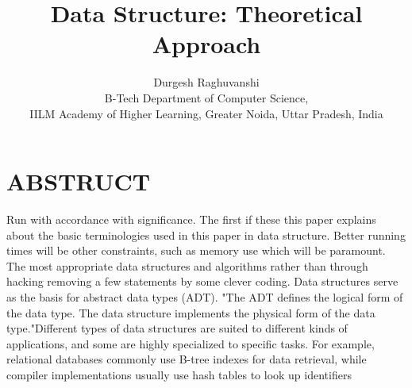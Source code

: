 \documentclass{article}
\title{Data Structure: Theoretical Approach}
\author{ Durgesh Raghuvanshi\\
         B-Tech Department of Computer Science,\\
IILM Academy of Higher Learning, Greater Noida, Uttar Pradesh, India}
\begin{document}
\section{ABSTRUCT}
Run with accordance with significance. The first if
these this paper explains about the basic terminologies
used in this paper in data structure. Better running
times will be other constraints, such as memory use
which will be paramount. The most appropriate data
structures and algorithms rather than through hacking
removing a few statements by some clever coding.
Data structures serve as the basis for abstract data
types (ADT). "The ADT defines the logical form of
the data type. The data structure implements the
physical form of the data type."Different types of data
structures are suited to different kinds of applications,
and some are highly specialized to specific tasks. For
example, relational databases commonly use B-tree
indexes for data retrieval, while compiler
implementations usually use hash tables to look up
identifiers
\end{document}
